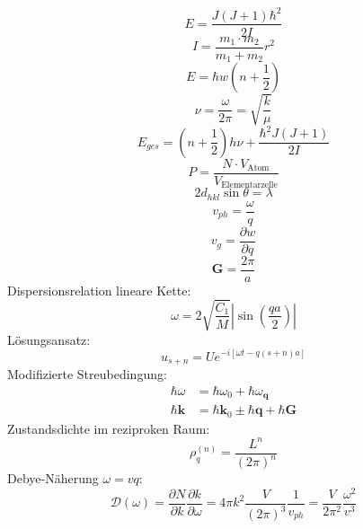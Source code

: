 \documentclass[11pt]{article}
\begin{document}
\begin{equation}
  E=\frac{J(J+1)\hbar^2}{2I}
\end{equation}
\begin{equation}
  I=\frac{m_1\cdot m_2}{m_1+m_2}{r^2}
\end{equation}
\begin{equation}
  E=\hbar w(n+\frac{1}{2})
\end{equation}
\begin{equation}
  \nu=\frac{\omega}{2\pi}=\sqrt{\frac{k}{\mu}}
\end{equation}
\begin{equation}
  E_{ges}=\left(n+\frac{1}{2}\right)h\nu+\frac{\hbar^2J(J+1)}{2I}
\end{equation}
\begin{equation}
  P=\frac{N\cdot V_{\text{Atom}}}{V_{\text{Elementarzelle}}}
\end{equation}
\begin{equation}
  2d_{hkl}\sin{\theta}=\lambda
\end{equation}
\begin{equation}
  v_{ph}=\frac{\omega}{q}
\end{equation}
\begin{equation}
  v_g=\frac{\partial w}{\partial q}
\end{equation}
\begin{equation}
  \bm{G}=\frac{2\pi}{a}
\end{equation}
Dispersionsrelation lineare Kette:
\begin{equation}
  \omega=2\sqrt{\frac{C_1}{M}}\left|\sin\left(\frac{qa}{2}\right)\right|
\end{equation}
Lösungsansatz:
\begin{equation}
  u_{s+n}=Ue^{-i[\omega t-q(s+n)a]}
\end{equation}
Modifizierte Streubedingung:
\begin{equation}
  \begin{align}
    \hbar\omega&=\hbar\omega_0+\hbar\omega_{\bm{q}}\\
    \hbar\bm{k}&=\hbar\bm{k}_0\pm\hbar\bm{q}+\hbar\bm{G}
  \end{align}
\end{equation}
Zustandsdichte im reziproken Raum:
\begin{equation}
  \rho_q^{(n)}=\frac{L^{n}}{(2\pi)^n}
\end{equation}
Debye-Näherung $\omega=vq$:
\begin{equation}
  \mathcal{D}(\omega)=\frac{\partial N}{\partial k}\frac{\partial k}
  {\partial \omega}=4\pi k^2\frac{V}{(2\pi)^3}\frac{1}{v_{ph}}=
  \frac{V}{2\pi^2}\frac{\omega^2}{v^3}
\end{equation}
\end{document}
